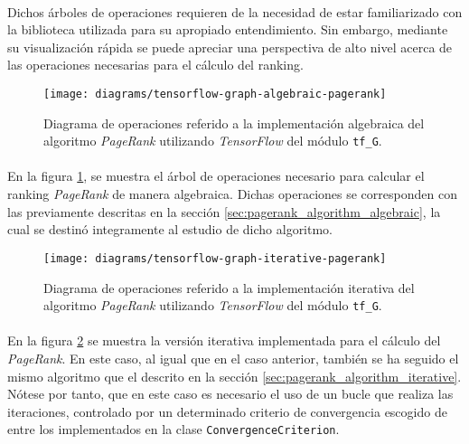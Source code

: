 \documentclass{subfiles}
\begin{document}
          \paragraph{}
          Dichos árboles de operaciones requieren de la necesidad de estar familiarizado con la biblioteca utilizada para su apropiado entendimiento. Sin embargo, mediante su visualización rápida se puede apreciar una perspectiva de alto nivel acerca de las operaciones necesarias para el cálculo del ranking.

          \begin{figure}[h!]
            \centering
            \texttt{[image: diagrams/tensorflow-graph-algebraic-pagerank]}
            \caption{Diagrama de operaciones referido a la implementación algebraica del algoritmo \emph{PageRank} utilizando \emph{TensorFlow} del módulo \texttt{tf\_G}.}
            \label{img:pagerank_algebraic_diagram}
          \end{figure}

          \paragraph{}
          En la figura \ref{img:pagerank_algebraic_diagram}, se muestra el árbol de operaciones necesario para calcular el ranking \emph{PageRank} de manera algebraica. Dichas operaciones se corresponden con las previamente descritas en la sección \ref{sec:pagerank_algorithm_algebraic}, la cual se destinó integramente al estudio de dicho algoritmo.

          \begin{figure}[h!]
            \centering
            \texttt{[image: diagrams/tensorflow-graph-iterative-pagerank]}
            \caption{Diagrama de operaciones referido a la implementación iterativa del algoritmo \emph{PageRank} utilizando \emph{TensorFlow} del módulo \texttt{tf\_G}.}
            \label{img:pagerank_iterative_diagram}
          \end{figure}

          \paragraph{}
          En la figura \ref{img:pagerank_iterative_diagram} se muestra la versión iterativa implementada para el cálculo del \emph{PageRank}. En este caso, al igual que en el caso anterior, también se ha seguido el mismo algoritmo que el descrito en la sección \ref{sec:pagerank_algorithm_iterative}. Nótese por tanto, que en este caso es necesario el uso de un bucle que realiza las iteraciones, controlado por un determinado criterio de convergencia escogido de entre los implementados en la clase \texttt{ConvergenceCriterion}.
\end{document}

